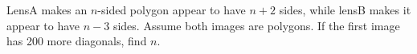 LensA makes an $ n $-sided polygon appear to have $ n+2 $ sides, while lensB makes it appear to have $ n-3 $ sides. Assume both images are polygons. If the first image has 200 more diagonals, find $ n $.
